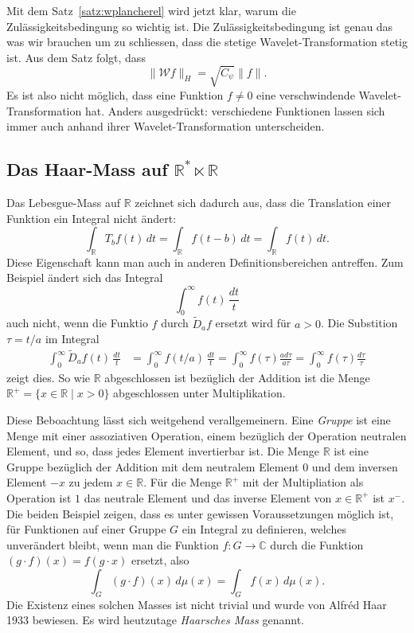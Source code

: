 Mit dem Satz~\ref{satz:wplancherel} wird jetzt klar, warum die
Zulässigkeitsbedingung so wichtig ist.
Die Zulässigkeitsbedingung ist genau das was wir brauchen um zu schliessen,
dass die stetige Wavelet-Transformation stetig ist.
Aus dem Satz folgt, dass
\[
\| \mathcal{W}f \|_H = \sqrt{C_{\psi}}\|f\|.
\]
Es ist also nicht möglich, dass eine Funktion $f\ne 0$ eine verschwindende
Wavelet-Transformation hat.
Anders ausgedrückt: verschiedene Funktionen lassen sich immer auch anhand
ihrer Wavelet-Transformation unterscheiden.

\subsection{Das Haar-Mass auf $\mathbb R^* \ltimes \mathbb R$
\label{subsection:haar-mass}}
Das Lebesgue-Mass auf $\mathbb R$ zeichnet sich dadurch aus, dass
die Translation einer Funktion ein Integral nicht ändert:
\[
\int_{\mathbb R} T_bf(t)\,dt
=
\int_{\mathbb R} f(t-b)\,dt
=
\int_{\mathbb R} f(t)\,dt.
\]
Diese Eigenschaft kann man auch in anderen Definitionsbereichen antreffen.
Zum Beispiel ändert sich das Integral
\[
\int_0^\infty f(t)\,\frac{dt}{t}
\]
auch nicht, wenn die Funktio $f$ durch $\tilde{D}_af$ ersetzt wird
für $a>0$.
Die Substition $\tau = t/a$ im Integral
\begin{align*}
\int_0^\infty \tilde{D}_af(t)\,\frac{dt}{t}
&=
\int_0^\infty f(t/a)\,\frac{dt}{t}
=
\int_0^\infty f(\tau) \frac{a d\tau}{a\tau}
=
\int_0^\infty f(\tau) \frac{d\tau}{\tau}
\end{align*}
zeigt dies.
So wie $\mathbb R$ abgeschlossen ist bezüglich der Addition ist die Menge
$\mathbb R^+=\{x\in\mathbb R\;|\; x > 0\}$ abgeschlossen unter Multiplikation.

Diese Beboachtung lässt sich weitgehend verallgemeinern.
Eine {\em Gruppe} ist eine Menge mit einer assoziativen Operation, einem
bezüglich der Operation neutralen Element, und so, dass jedes Element
invertierbar ist.
Die Menge $\mathbb R$ ist eine Gruppe bezüglich der Addition mit dem neutralem
Element $0$ und dem inversen Element $-x$ zu jedem $x\in\mathbb R$.
Für die Menge $\mathbb R^+$ mit der Multipliation als Operation ist
$1$ das neutrale Element und das inverse Element von $x\in\mathbb R^+$
ist $x^{-}$.
Die beiden Beispiel zeigen, dass es unter gewissen Voraussetzungen
möglich ist, für Funktionen auf einer Gruppe $G$ ein Integral zu definieren,
welches unverändert bleibt, wenn man die Funktion $f:G\to \mathbb C$ 
durch die Funktion $(g\cdot f)(x) = f(g\cdot x)$ ersetzt, also
\[
\int_G (g\cdot f)(x)\,d\mu(x)
=
\int_G f(x)\,d\mu(x).
\]
Die Existenz eines solchen Masses ist nicht trivial und wurde
von Alfréd Haar 1933 bewiesen. 
Es wird heutzutage {\em Haarsches Mass} genannt.

